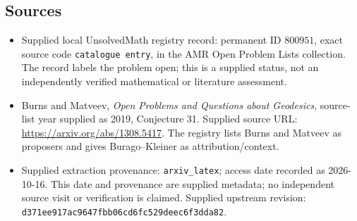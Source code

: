\documentclass[11pt]{article}
\begin{document}
\subsection{Sources}
\begin{itemize}
\item Supplied local UnsolvedMath registry record: permanent ID \(800951\), exact source code \texttt{catalogue entry}, in the AMR Open Problem Lists collection. The record labels the problem open; this is a supplied status, not an independently verified mathematical or literature assessment.
\item Burns and Matveev, \emph{Open Problems and Questions about Geodesics}, source-list year supplied as 2019, Conjecture 31. Supplied source URL: \url{https://arxiv.org/abs/1308.5417}. The registry lists Burns and Matveev as proposers and gives Burago--Kleiner as attribution/context.
\item Supplied extraction provenance: \texttt{arxiv\_latex}; access date recorded as 2026-10-16. This date and provenance are supplied metadata; no independent source visit or verification is claimed. Supplied upstream revision: \texttt{d371ee917ac9647fbb06cd6fc529deec6f3dda82}.
\end{itemize}
\end{document}
